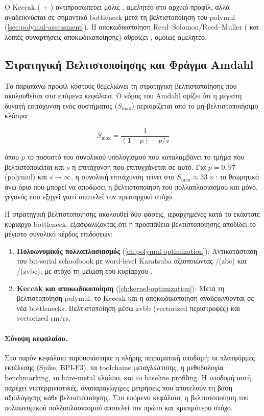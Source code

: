 Ο Keccak ( + )
αντιπροσωπεύει μόλις , αμελητέο στο αρχικό προφίλ, αλλά
αναδεικνύεται σε σημαντικό bottleneck μετά τη βελτιστοποίηση του polymul
(\cf \cref{sec:polymul-assessment}). Η αποκωδικοποίηση Reed–Solomon/Reed–Muller 
( και λοιπές συναρτήσεις αποκωδικοποίησης) αθροίζει , ομοίως αμελητέο.

\subsection{Στρατηγική Βελτιστοποίησης και Φράγμα Amdahl}
\label{ssec:baseline-strategy}

Το παραπάνω προφίλ κόστους θεμελιώνει τη στρατηγική
βελτιστοποίησης που ακολουθείται στα επόμενα κεφάλαια. Ο νόμος του Amdahl
ορίζει ότι η μέγιστη δυνατή επιτάχυνση ενός συστήματος ($S_{\max}$) περιορίζεται από το
μη-βελτιστοποιήσιμο κλάσμα:

\begin{equation}
 S_{\max} = \frac{1}{(1 - p) + p/s}
\end{equation}

\noindent
όπου $p$ το ποσοστό του συνολικού υπολογισμού που καταλαμβάνει το
τμήμα που βελτιστοποιείται και $s$ η επιτάχυνση που επιτυγχάνεται σε αυτό. 
Για $p = 0{,}97$ (polymul) και $s \to \infty$, η συνολική επιτάχυνση τείνει
στο $S_{\max} \approx 33\times$: το θεωρητικό άνω όριο που μπορεί να αποδώσει η
βελτιστοποίηση του πολλαπλασιασμού και μόνο, γεγονός που εξηγεί γιατί αποτελεί
τον πρωταρχικό στόχο.

Η στρατηγική βελτιστοποίησης ακολουθεί δύο φάσεις, ιεραρχημένες κατά το
εκάστοτε κυρίαρχο bottleneck, εξασφαλίζοντας ότι η προσπάθεια βελτιστοποίησης αποδίδει το μέγιστο
συνολικό κέρδος επιδόσεων:

\begin{enumerate}
  \item \textbf{Πολυωνυμικός πολλαπλασιασμός} (\cref{ch:polymul-optimization}):
    Αντικατάσταση του bit-serial schoolbook με word-level Karatsuba αξιοποιώντας
    \clmul/\clmulh (\gls{zbc}) και \vclmul/\vclmulh (\gls{zvbc}), με στόχο τη μείωση
     του κυρίαρχου .

  \item \textbf{Keccak και αποκωδικοποίηση} (\cref{ch:kernel-optimization}):
    Μετά τη βελτιστοποίηση polymul, το Keccak και η αποκωδικοποίηση
    αναδεικνύονται σε νέα bottlenecks. Βελτιστοποίηση μέσω \gls{zvbb}
    (vectorized περιστροφές) και vectorized \gls{rm}/\gls{rs}.
\end{enumerate}


\paragraph{Σύνοψη κεφαλαίου.}
Στο παρόν κεφάλαιο παρουσιάστηκε η πλήρης πειραματική υποδομή: οι πλατφόρμες
εκτέλεσης (Spike, BPI-F3), τα toolchains μεταγλώττισης, η μεθοδολογία
benchmarking, το bare-metal πλαίσιο, και το baseline profiling. Η υποδομή αυτή παρέχει ντετερμινιστικές, αναπαραγώγιμες
μετρήσεις \instret που αποτελούν τη βάση αξιολόγησης κάθε βελτιστοποίησης.
Στο επόμενο κεφάλαιο, η βελτιστοποίηση του πολυωνυμικού πολλαπλασιασμού 
αποτελεί τον πρώτο και κρισιμότερο στόχο.
